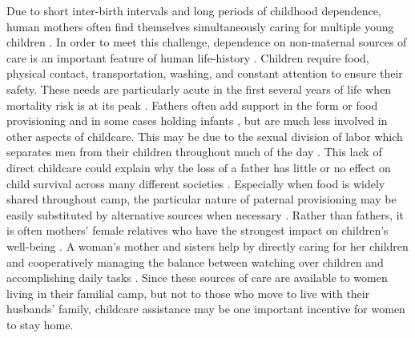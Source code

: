 Due to short inter-birth intervals and long periods of childhood dependence, human mothers often find themselves simultaneously caring for multiple young children \cite{key2000evolution}.  In order to meet this challenge, dependence on non-maternal sources of care is an important feature of human life-history \cite{hawkes1998grandmothering, kaplan2000theory}.  Children require food, physical contact, transportation, washing, and constant attention to ensure their safety.  These needs are particularly acute in the first several years of life when mortality risk is at its peak \cite{hill1996ache}.  Fathers often add support in the form or food provisioning and in some cases holding infants \cite{marlowe2003critical, crittenden2008allomaternal}, but are much less involved in other aspects of childcare.  This may be due to the sexual division of labor which separates men from their children throughout much of the day \cite{hewlett1992father}.  This lack of direct childcare could explain why the loss of a father has little or no effect on child survival across many different societies \cite{sear2008keeps}.  Especially when food is widely shared throughout camp, the particular nature of paternal provisioning may be easily substituted by alternative sources when necessary \cite{sugiyama2005juvenile, kaplan1984food, hawkes2001hadza}.  Rather than fathers, it is often mothers' female relatives who have the strongest impact on children's well-being \cite{sear2008keeps}.  A woman's mother and sisters help by directly caring for her children and cooperatively managing the balance between watching over children and accomplishing daily tasks \cite{valeggia2009changing, henry2005child, crittenden2008allomaternal, hawkes1997hadza}.  Since these sources of care are available to women living in their familial camp, but not to those who move to live with their husbands' family, childcare assistance may be one important incentive for women to stay home.  

